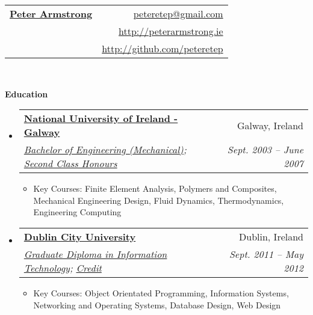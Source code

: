 \documentclass[letterpaper,11pt]{article}
\makeatletter
\newcommand{\resitem}[1]{\item #1 \vspace{-2pt}}
\newcommand{\resheading}[1]{{\large \colorbox{mygrey}{\begin{minipage}{\textwidth}{\textbf{#1 \vphantom{p\^{E}}}}\end{minipage}}}}
\newcommand{\ressubheading}[4]{
\begin{tabular*}{6.5in}{l@{\extracolsep{\fill}}r}
		\textbf{#1} & #2 \\
		\textit{#3} & \textit{#4} \\
\end{tabular*}\vspace{-6pt}}
\makeatother
\begin{document}
\newcommand{\mywebheader}{
\begin{tabular*}{7in}{l@{\extracolsep{\fill}}r}
	\textbf{\href{http://www.peterarmstrong.ie/}{\LARGE Peter Armstrong}} & \href{mailto:peteretep@gmail.com}{peteretep@gmail.com}\\
	& \href{http://www.peterarmstrong.ie}{http://peterarmstrong.ie} \\
	& \href{http://github.com/peteretep}{http://github.com/peteretep}
	\end{tabular*}
\\
\vspace{0.1in}}

\mywebheader

\resheading{Education}
	\begin{itemize}
		\item
			\ressubheading{\href{http://www.nuigalway.ie}{National University of Ireland - Galway}}{Galway, Ireland}
			{\href{http://www.nuigalway.ie/courses/undergraduate-courses/mechanical-engineering.html}{Bachelor of Engineering (Mechanical)}; 
			\href{http://peterarmstrong.ie/portfolio/mech_eng_transcript.jpg}{Second Class Honours}}
      {Sept. 2003 -- June 2007}
				{ \footnotesize
				\begin{itemize}

					\resitem{Key Courses: Finite Element Analysis, Polymers and Composites, Mechanical Engineering Design, Fluid Dynamics, Thermodynamics, Engineering Computing }
				\end{itemize}
				}

		\item
			\ressubheading{\href{http://www.dcu.ie}{Dublin City University}}{Dublin, Ireland}{\href{https://www.dcu.ie/prospective/deginfo.php?classname=GDF\&originating_school=40}{Graduate Diploma in Information Technology};
      \href{http://peterarmstrong.ie/cv/grad_dip_it_transcript.pdf}{Credit}}
      {Sept. 2011 -- May 2012}
				{ \footnotesize
				\begin{itemize}
				\resitem{Key Courses: Object Orientated Programming, Information Systems, Networking and Operating Systems, Database Design, Web Design}
				\end{itemize}
				}


	\end{itemize} %
\end{document}
